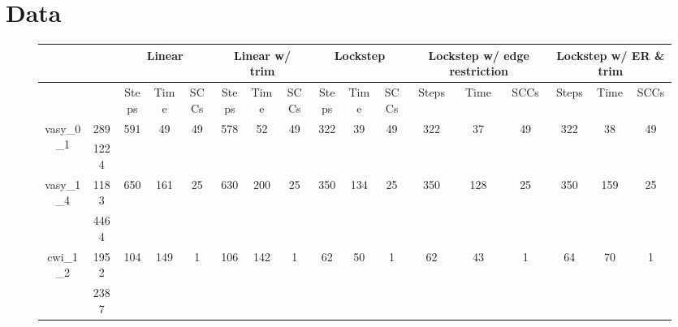 \documentclass[../master/master.tex]{subfiles}
\begin{document}
\section{Data}
\begin{figure}
\begin{adjustbox}{angle=90}
\centering
\begin{tabular}{ |c|c||c|c|c||c|c|c||c|c|c||c|c|c||c|c|c| } 
\hline
 \multicolumn{2}{|c||}{} & \multicolumn{3}{c||}{Linear} & \multicolumn{3}{c||}{Linear w/ trim} & \multicolumn{3}{c||}{Lockstep} & \multicolumn{3}{c||}{Lockstep w/ edge restriction} & \multicolumn{3}{c|}{Lockstep w/ ER \& trim}\\
\hline
\multicolumn{2}{|c||}{}& Steps & Time & SCCs& Steps & Time & SCCs& Steps & Time & SCCs& Steps & Time & SCCs& Steps & Time & SCCs\\
\hline
\multirow{2}{3.6em}{vasy\_0\_1} & 289 & \multirow{2}{3.6em}{591} & \multirow{2}{3.6em}{49 } & \multirow{2}{3.6em}{49} & \multirow{2}{3.6em}{578} & \multirow{2}{3.6em}{52 } & \multirow{2}{3.6em}{49} & \multirow{2}{3.6em}{322} & \multirow{2}{3.6em}{39 } & \multirow{2}{3.6em}{49} & \multirow{2}{3.6em}{322} & \multirow{2}{3.6em}{37 } & \multirow{2}{3.6em}{49} & \multirow{2}{3.6em}{322} & \multirow{2}{3.6em}{38 } & \multirow{2}{3.6em}{49} \\
\cline{2-2}
 & 1224  &  &  &  &  &  &  &  &  &  &  &  &  &  &  &  \\
\hline
\multirow{2}{3.6em}{vasy\_1\_4} & 1183 & \multirow{2}{3.6em}{650} & \multirow{2}{3.6em}{161 } & \multirow{2}{3.6em}{25} & \multirow{2}{3.6em}{630} & \multirow{2}{3.6em}{200 } & \multirow{2}{3.6em}{25} & \multirow{2}{3.6em}{350} & \multirow{2}{3.6em}{134 } & \multirow{2}{3.6em}{25} & \multirow{2}{3.6em}{350} & \multirow{2}{3.6em}{128 } & \multirow{2}{3.6em}{25} & \multirow{2}{3.6em}{350} & \multirow{2}{3.6em}{159 } & \multirow{2}{3.6em}{25} \\
\cline{2-2}
 & 4464  &  &  &  &  &  &  &  &  &  &  &  &  &  &  &  \\
\hline
\multirow{2}{3.6em}{cwi\_1\_2} & 1952 & \multirow{2}{3.6em}{104} & \multirow{2}{3.6em}{149 } & \multirow{2}{3.6em}{1} & \multirow{2}{3.6em}{106} & \multirow{2}{3.6em}{142 } & \multirow{2}{3.6em}{1} & \multirow{2}{3.6em}{62} & \multirow{2}{3.6em}{50 } & \multirow{2}{3.6em}{1} & \multirow{2}{3.6em}{62} & \multirow{2}{3.6em}{43 } & \multirow{2}{3.6em}{1} & \multirow{2}{3.6em}{64} & \multirow{2}{3.6em}{70 } & \multirow{2}{3.6em}{1} \\
\cline{2-2}
 & 2387  &  &  &  &  &  &  &  &  &  &  &  &  &  &  &  \\

\end{tabular}
\end{adjustbox}
\end{figure}
\end{document}
